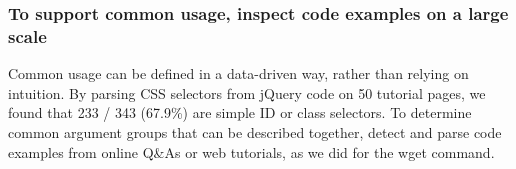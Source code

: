 \begin{changes}
\subsubsection{To support common usage, inspect code examples on a large scale}
Common usage can be defined in a data-driven way, rather than relying on intuition.
By parsing CSS selectors from jQuery code on 50 tutorial pages, we found that 233 / 343 (67.9\%) are simple ID or class selectors.
To determine common argument groups that can be described together, detect and parse code examples from online Q\&As or web tutorials, as we did for the wget command.

\end{changes}
